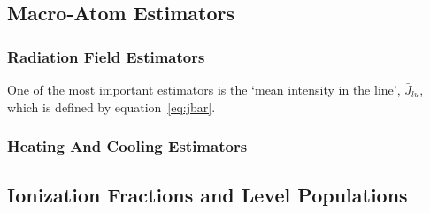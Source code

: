 


 

\subsection{Macro-Atom Estimators}


\subsubsection{Radiation Field Estimators}

One of the most important estimators is the `mean intensity in the line', $\bar{J}_{lu}$,
which is defined by equation~\ref{eq:jbar}. 


\subsubsection{Heating And Cooling Estimators}

\subsection{Ionization Fractions and Level Populations}




